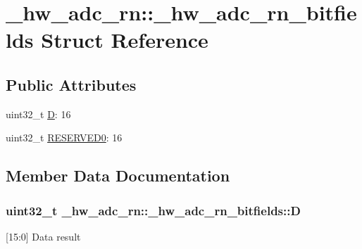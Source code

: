 \hypertarget{struct__hw__adc__rn_1_1__hw__adc__rn__bitfields}{}\section{\+\_\+hw\+\_\+adc\+\_\+rn\+:\+:\+\_\+hw\+\_\+adc\+\_\+rn\+\_\+bitfields Struct Reference}
\label{struct__hw__adc__rn_1_1__hw__adc__rn__bitfields}
\subsection*{Public Attributes}
\begin{DoxyCompactItemize}
\item 
uint32\+\_\+t \hyperlink{struct__hw__adc__rn_1_1__hw__adc__rn__bitfields_a9db99992ceef769dbff4d7dcdeadd32d}{D}\+: 16
\item 
uint32\+\_\+t \hyperlink{struct__hw__adc__rn_1_1__hw__adc__rn__bitfields_a77b3db2914be205381a26874f3c24bc1}{R\+E\+S\+E\+R\+V\+E\+D0}\+: 16
\end{DoxyCompactItemize}


\subsection{Member Data Documentation}
\subsubsection[{\texorpdfstring{D}{D}}]{\setlength{\rightskip}{0pt plus 5cm}uint32\+\_\+t \+\_\+hw\+\_\+adc\+\_\+rn\+::\+\_\+hw\+\_\+adc\+\_\+rn\+\_\+bitfields\+::D}\hypertarget{struct__hw__adc__rn_1_1__hw__adc__rn__bitfields_a9db99992ceef769dbff4d7dcdeadd32d}{}\label{struct__hw__adc__rn_1_1__hw__adc__rn__bitfields_a9db99992ceef769dbff4d7dcdeadd32d}
\mbox{[}15\+:0\mbox{]} Data result 
